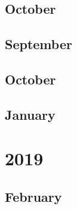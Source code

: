 \documentclass[12pt]{article}
\begin{document}
\subsection{October}
\begin{refsection}
    \nocite{sanh_multitask_2022}
    \printbibliography[heading=none]
\end{refsection}

\subsection{September}
\begin{refsection}
    \nocite{wei_finetuned_2021}
    \printbibliography[heading=none]
\end{refsection}


\subsection{October}
\begin{refsection}
    \nocite{bommasani_opportunities_2022}
    \printbibliography[heading=none]
\end{refsection}


\subsection{January}
\begin{refsection}
    \nocite{}
    \printbibliography[heading=none]
\end{refsection}

\newpage
\section{2019}
\subsection{February}
\begin{refsection}
    \nocite{radford_language_2019}
    \printbibliography[heading=none]
\end{refsection}
\end{document}
